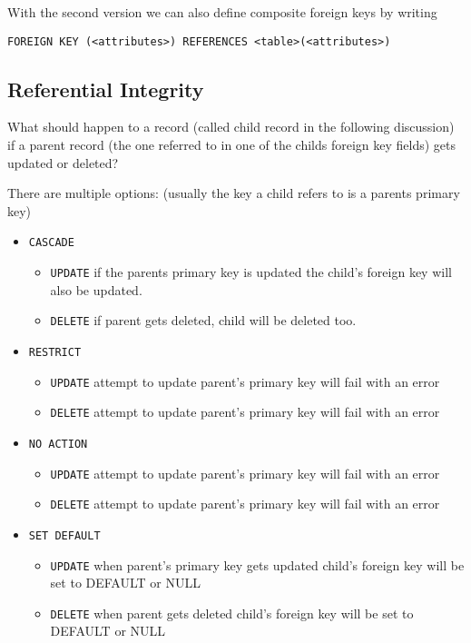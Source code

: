 \documentclass{sciposter}
\renewcommand{\t}[1]{\texttt{#1}}
\begin{document}
\begin{multicols}{3}
With the second version we can also define composite foreign keys by writing

\t{FOREIGN KEY (<attributes>) REFERENCES <table>(<attributes>)}

\subsection*{Referential Integrity}

What should happen to a record (called child record in the following discussion) if a parent record (the one referred to in one of the childs foreign key fields) gets updated or deleted?

There are multiple options: (usually the key a child refers to is a parents primary key)

\begin{itemize}
	\item \t{CASCADE}
	\begin{itemize} 
		\item \t{UPDATE} if the parents primary key is updated the child's foreign key will also be updated.
		\item \t{DELETE} if parent gets deleted, child will be deleted too.
	\end{itemize}
	\item \t{RESTRICT}
	\begin{itemize} 
		\item \t{UPDATE} attempt to update parent's primary key will fail with an error
		\item \t{DELETE} attempt to update parent's primary key will fail with an error
	\end{itemize}
	\item \t{NO ACTION}
	\begin{itemize} 
		\item \t{UPDATE} attempt to update parent's primary key will fail with an error
		\item \t{DELETE} attempt to update parent's primary key will fail with an error
	\end{itemize}
	\item \t{SET DEFAULT}
	\begin{itemize} 
		\item \t{UPDATE} when parent's primary key gets updated child's foreign key will be set to DEFAULT or NULL
		\item \t{DELETE} when parent gets deleted child's foreign key will be set to DEFAULT or NULL
	\end{itemize}
\end{itemize}


\end{multicols}
\end{document}

